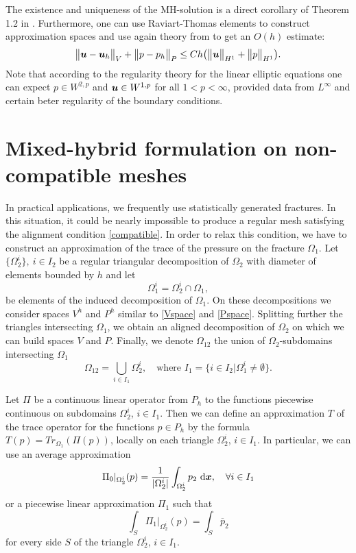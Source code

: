 \documentclass{Mamern09}
\def\d{\,{\rm d}}               %
\def\vc#1{\mathbf{\boldsymbol{#1}}}     %
\def\abs#1{\lvert#1\rvert}
\def\norm#1{\bigl\Vert#1\bigr\Vert} %
\def\ol#1{\overline{#1}}
\def\vx{\vc{x}}
\def\dx{\,\d\vx}
\begin{document}
The existence and uniqueness of the MH-solution is a direct corollary of Theorem 1.2 in \cite{Brezzi}.
Furthermore, one can use Raviart-Thomas elements to construct approximation spaces and use again theory
from \cite{Brezzi} to get an $O(h)$ estimate:
\begin{equation}\label{CompatibleConvergence}
 \norm{\vl-\vl_h}_{V} + \norm{p-p_h}_{P} \le C h\big(\norm{\vl}_{H^1} + \norm{p}_{H^1}\big).
\end{equation}
Note that according to the regularity theory for the linear elliptic equations one can expect $p\in W^{2,p}$ and $\vl\in W^{1,p}$ for all $1<p<\infty$, provided data from $L^\infty$ and certain beter regularity of the boundary conditions.

\section{Mixed-hybrid formulation on non-compatible meshes}
In practical applications, we frequently use statistically generated fractures. In this situation,
it could be nearly impossible to produce a regular mesh satisfying the alignment condition
\eqref{compatible}.  In order to relax this condition, we have to construct an approximation of
the trace of the pressure on the fracture $\Omega_1$. Let $\{\Omega_2^i\},\ i\in I_2$ be a regular triangular decomposition of $\Omega_2$ with diameter of elements bounded by $h$ and let
\[
        \Omega_1^i=\Omega_2^i \cap \Omega_1,
\] be elements of the induced decomposition of $\Omega_1$.
On these decompositions we consider spaces $V^h$ and $P^h$ similar to \eqref{Vspace} and \eqref{Pspace}. Splitting further the triangles intersecting $\Omega_1$, we obtain an aligned decomposition of $\Omega_2$ on which we can build spaces $V$ and $P$.
Finally, we denote $\Omega_{12}$ the union of $\Omega_2$-subdomains intersecting $\Omega_1$
\[
  \Omega_{12}=\bigcup_{i\in I_{1}} \Omega_2^i,\quad
   \text{where }  I_{1}=\{i\in I_2| \Omega_1^i  \ne \emptyset \}.
\]

Let $\Pi$ be a continuous linear operator from $P_h$ to the functions piecewise continuous on
subdomains $\Omega_2^i$, $i\in I_1$. Then we can define an approximation $T$ of the trace operator for the functions $p\in P_h$ by the formula $T(p)=Tr_{\Omega_1}(\Pi(p))$, locally on each triangle $\Omega_2^i$, $i\in I_1$. In particular, we can use an average approximation
\[
   \Pi_0 |_{\Omega_2^i}(p) = \frac{1}{\abs{\Omega_2^i}}
   		\int_{\Omega_2^i} p_2 \dx,\quad \forall i\in I_{1}
\]
or a piecewise linear approximation $\Pi_1$ such that
\[
  \int_S \Pi_1|_{\Omega_2^i}(p) = \int_S \ol{p}_2
\]
for every side $S$ of the triangle $\Omega_2^i$, $i\in I_{1}$.
\end{document}
